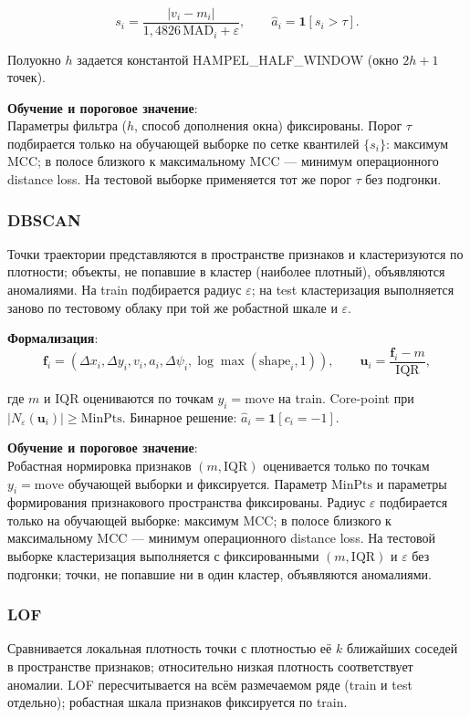 \documentclass[a4paper,12pt]{report}
\begin{document}
	$$s_i=\frac{|v_i-m_i|}{1{,}4826\,\mathrm{MAD}_i+\varepsilon}, \qquad \hat a_i=\mathbf{1}[s_i>\tau].$$

	Полуокно $h$ задается константой HAMPEL\_HALF\_WINDOW (окно $2h+1$ точек).

	\textbf{Обучение и пороговое значение}:\\
	Параметры фильтра ($h$, способ дополнения окна) фиксированы. Порог $\tau$ подбирается только на обучающей выборке по сетке квантилей $\{s_i\}$: максимум MCC; в полосе близкого к максимальному MCC — минимум операционного distance loss. На тестовой выборке применяется тот же порог $\tau$ без подгонки.

	\subsubsection{DBSCAN}
	Точки траектории представляются в пространстве признаков и кластеризуются по плотности; объекты, не попавшие в кластер (наиболее плотный), объявляются аномалиями. На train подбирается радиус $\varepsilon$; на test кластеризация выполняется заново по тестовому облаку при той же робастной шкале и $\varepsilon$.

	\textbf{Формализация}:\\
	$$\mathbf f_i=(\Delta x_i,\Delta y_i,v_i,a_i,\Delta\psi_i,\log\max(\mathrm{shape}_i,1)), \qquad \mathbf u_i=\frac{\mathbf f_i-m}{\mathrm{IQR}},$$

	где $m$ и $\mathrm{IQR}$ оцениваются по точкам $y_i=\mathrm{move}$ на train. Core-point при $|N_\varepsilon(\mathbf u_i)|\ge \mathrm{MinPts}$. Бинарное решение: $\hat a_i=\mathbf{1}[c_i=-1]$.

	\textbf{Обучение и пороговое значение}:\\
	Робастная нормировка признаков $(m,\mathrm{IQR})$ оценивается только по точкам $y_i=\mathrm{move}$ обучающей выборки и фиксируется. Параметр $\mathrm{MinPts}$ и параметры формирования признакового пространства фиксированы. Радиус $\varepsilon$ подбирается только на обучающей выборке: максимум MCC; в полосе близкого к максимальному MCC — минимум операционного distance loss. На тестовой выборке кластеризация выполняется с фиксированными $(m,\mathrm{IQR})$ и $\varepsilon$ без подгонки; точки, не попавшие ни в один кластер, объявляются аномалиями.

	\subsubsection{LOF}
	Сравнивается локальная плотность точки с плотностью её $k$ ближайших соседей в пространстве признаков; относительно низкая плотность соответствует аномалии. LOF пересчитывается на всём размечаемом ряде (train и test отдельно); робастная шкала признаков фиксируется по train.
\end{document}
